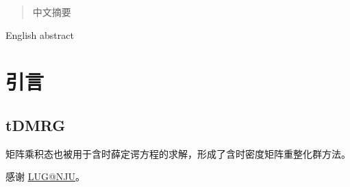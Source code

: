 \documentclass[
    ]{njuthesis}
\begin{document}

\maketitle



\begin{abstract}
    中文摘要
\end{abstract}

\begin{abstract*}
    English abstract
\end{abstract*}

\tableofcontents
\listoffigures
\listoftables

\mainmatter

%   
%   

\chapter{引言}

\section{tDMRG}

矩阵乘积态也被用于含时薛定谔方程的求解，形成了含时密度矩阵重整化群方法\cite{schollwock2011}。


\printbibliography


\begin{acknowledgement}
    感谢 \href{https://git.nju.edu.cn/nju-lug/lug-introduction}{LUG@NJU}。
\end{acknowledgement}


\appendix


\end{document}
